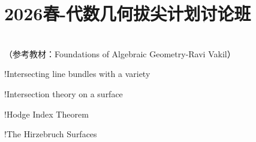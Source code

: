 \section{2026春-代数几何拔尖计划讨论班}

\begin{center}
    \\ （参考教材：Foundations of Algebraic Geometry-Ravi Vakil）

\end{center}

\begin{structure}

    \subpage!{Intersecting line bundles with a variety}

    \subpage!{Intersection theory on a surface}

    \subpage!{Hodge Index Theorem}


   \subpage!{The Hirzebruch Surfaces}

\end{structure}